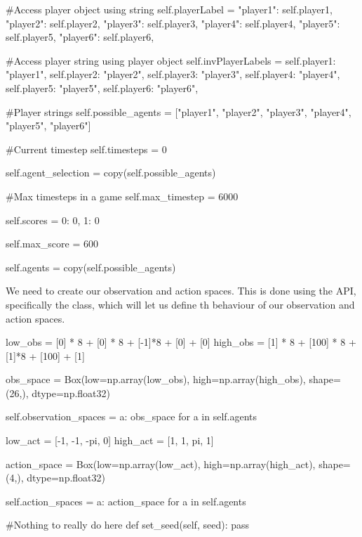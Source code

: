\begin{mpy}
        #Access player object using string
        self.playerLabel = {"player1": self.player1,
                            "player2": self.player2,
                            "player3": self.player3,
                            "player4": self.player4,
                            "player5": self.player5,
                            "player6": self.player6,
        }

        #Access player string using player object
        self.invPlayerLabels = {self.player1: "player1",
                                self.player2: "player2",
                                self.player3: "player3",
                                self.player4: "player4",
                                self.player5: "player5",
                                self.player6: "player6",
        }

        #Player strings
        self.possible_agents = ["player1", "player2", "player3", "player4", "player5", "player6"]

        #Current timestep
        self.timesteps = 0

        self.agent_selection = copy(self.possible_agents)

        #Max timesteps in a game
        self.max_timestep = 6000

        self.scores = {0: 0, 
                       1: 0}

        self.max_score = 600

        self.agents = copy(self.possible_agents)
\end{mpy}


We need to create our observation and action spaces. This is done using the  API, specifically the  class, which will let us define th behaviour of our observation and action spaces.

\begin{mpy}

        low_obs = [0] * 8 + [0] * 8 + [-1]*8 + [0] + [0]
        high_obs = [1] * 8 + [100] * 8 + [1]*8 + [100] + [1]

        obs_space = Box(low=np.array(low_obs), high=np.array(high_obs), shape=(26,), dtype=np.float32)

        self.observation_spaces = {a: obs_space for a in self.agents}


        low_act = [-1, -1, -pi, 0]
        high_act = [1, 1, pi, 1]

        action_space = Box(low=np.array(low_act), high=np.array(high_act), shape=(4,), dtype=np.float32)

        self.action_spaces = {a: action_space for a in self.agents}


    #Nothing to really do here
    def set_seed(self, seed):
        pass

\end{mpy}

